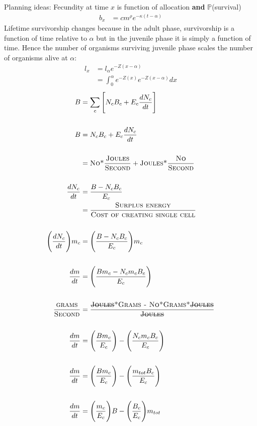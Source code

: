 \documentclass[a4paper]{article} %
\begin{document}
Planning ideas:
Fecundity at time $x$ is function of allocation \textbf{and} $\mathbb{P}$(survival)
\begin{align*}
    b_x &= cm^{\rho}e^{-\kappa(t-\alpha)}
\end{align*}
Lifetime survivorship changes because in the adult phase, survivorship is a function of time relative to $\alpha$ but in the juvenile phase it is simply a function of time. Hence the number of organisms surviving juvenile phase scales the number of organisms alive at $\alpha$:
\begin{align*}
    l_x &= l_{\alpha}e^{-Z(x-\alpha)} \\
    &= \int_0^{\alpha}e^{-Z(x)}e^{-Z(x-\alpha)} dx
\end{align*}
\newpage
\begin{align*}
    B &= \sum_c \Bigg[N_{c}B_{c} + E_{c}\frac{dN_{c}}{dt}\Bigg] \\ \\
    B &= N_{c}B_{c} + E_{c}\frac{dN_{c}}{dt} \\ \\
    &= \textsc{No*}\frac{\textsc{Joules}}{\textsc{Second}} + \textsc{Joules*}\frac{\textsc{No}}{\textsc{Second}}\\ \\
    \frac{dN_{c}}{dt} &= \frac{B - N_{c}B_{c}}{E_{c}} \\
    &= \frac{\textsc{Surplus energy}}{\textsc{Cost of creating single cell}} \\ \\
    \Bigg(\frac{dN_{c}}{dt}\Bigg)m_c &= \Bigg(\frac{B - N_{c}B_{c}}{E_{c}}\Bigg)m_c \\ \\
    \frac{dm}{dt} &= \Bigg(\frac{Bm_c - N_{c}m_{c}B_{c}}{E_c}\Bigg) \\ \\
    \frac{\textsc{grams}}{\textsc{Second}} &= \frac{\textsc{\st{Joules}*Grams - No*Grams*\st{Joules}}}{\textsc{\st{Joules}}} \\ \\
    \frac{dm}{dt} &= \Bigg(\frac{Bm_c}{E_c}\Bigg) - \Bigg(\frac{N_{c}m_{c}B_{c}}{E_c}\Bigg) \\ \\
    \frac{dm}{dt} &= \Bigg(\frac{Bm_c}{E_c}\Bigg) - \Bigg(\frac{m_{tot}B_{c}}{E_c}\Bigg) \\ \\
    \frac{dm}{dt} &= \Bigg(\frac{m_c}{E_c}\Bigg)B - \Bigg(\frac{B_{c}}{E_c}\Bigg)m_{tot} \\ \\

\end{align*}
\end{document}
